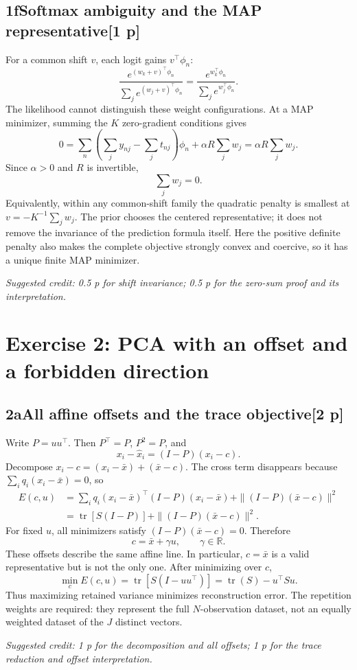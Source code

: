 \documentclass[11pt,a4paper]{article}
\newcommand{\R}{\mathbb R}
\DeclareMathOperator{\tr}{tr}
\newcommand{\solution}[3]{\Needspace{6\baselineskip}\subsection*{\color{examblue}#1\quad #2\hfill\normalsize[#3 p]}}
\newcommand{\selfcredit}[1]{\par\textit{Suggested credit: #1}\par}
\begin{document}
\solution{1f}{Softmax ambiguity and the MAP representative}{1}
For a common shift $v$, each logit gains $v^\top\phi_n$:
\[
\frac{e^{(w_k+v)^\top\phi_n}}{\sum_je^{(w_j+v)^\top\phi_n}}
=\frac{e^{w_k^\top\phi_n}}{\sum_je^{w_j^\top\phi_n}}.
\]
The likelihood cannot distinguish these weight configurations. At a MAP
minimizer, summing the $K$ zero-gradient conditions gives
\[
0=\sum_n\left(\sum_jy_{nj}-\sum_jt_{nj}\right)\phi_n
+\alpha R\sum_jw_j=\alpha R\sum_jw_j.
\]
Since $\alpha>0$ and $R$ is invertible,
\[
\boxed{\sum_jw_j=0}.
\]
Equivalently, within any common-shift family the quadratic penalty is smallest
at $v=-K^{-1}\sum_jw_j$. The prior chooses the centered representative; it
does not remove the invariance of the prediction formula itself. Here the
positive definite penalty also makes the complete objective strongly convex
and coercive, so it has a unique finite MAP minimizer.
\selfcredit{0.5 p for shift invariance; 0.5 p for the zero-sum proof and its interpretation.}

\newpage
\section*{Exercise 2: PCA with an offset and a forbidden direction}
\solution{2a}{All affine offsets and the trace objective}{2}
Write $P=uu^\top$. Then $P^\top=P$, $P^2=P$, and
\[
x_i-\widehat x_i=(I-P)(x_i-c).
\]
Decompose $x_i-c=(x_i-\bar x)+(\bar x-c)$. The cross term disappears because
$\sum_iq_i(x_i-\bar x)=0$, so
\begin{align*}
E(c,u)
&=\sum_iq_i(x_i-\bar x)^\top(I-P)(x_i-\bar x)
+\|(I-P)(\bar x-c)\|^2\\
&=\tr[S(I-P)]+\|(I-P)(\bar x-c)\|^2.
\end{align*}
For fixed $u$, all minimizers satisfy $(I-P)(\bar x-c)=0$. Therefore
\[
\boxed{c=\bar x+\gamma u,\qquad \gamma\in\R}.
\]
These offsets describe the same affine line. In particular, $c=\bar x$ is a
valid representative but is not the only one. After minimizing over $c$,
\[
\boxed{\min_c E(c,u)=\tr[S(I-uu^\top)]=\tr(S)-u^\top Su}.
\]
Thus maximizing retained variance minimizes reconstruction error. The repetition
weights are required: they represent the full $N$-observation dataset, not an
equally weighted dataset of the $J$ distinct vectors.
\selfcredit{1 p for the decomposition and all offsets; 1 p for the trace reduction and offset interpretation.}
\end{document}
